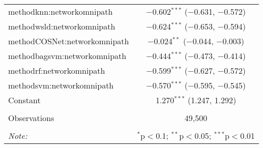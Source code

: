 \begin{table}[!htbp]
\begin{tabular}{@{\extracolsep{5pt}}lc}
  methodknn:networkomnipath & $-$0.602$^{***}$ ($-$0.631, $-$0.572) \\ 
  methodwsld:networkomnipath & $-$0.624$^{***}$ ($-$0.653, $-$0.594) \\ 
  methodCOSNet:networkomnipath & $-$0.024$^{**}$ ($-$0.044, $-$0.003) \\ 
  methodbagsvm:networkomnipath & $-$0.444$^{***}$ ($-$0.473, $-$0.414) \\ 
  methodrf:networkomnipath & $-$0.599$^{***}$ ($-$0.627, $-$0.572) \\ 
  methodsvm:networkomnipath & $-$0.570$^{***}$ ($-$0.595, $-$0.545) \\ 
  Constant & 1.270$^{***}$ (1.247, 1.292) \\ 
 \hline \\[-1.8ex] 
Observations & 49,500 \\ 
\hline 
\hline \\[-1.8ex] 
\textit{Note:}  & \multicolumn{1}{r}{$^{*}$p$<$0.1; $^{**}$p$<$0.05; $^{***}$p$<$0.01} \\ 
\end{tabular} 
\end{table} 
